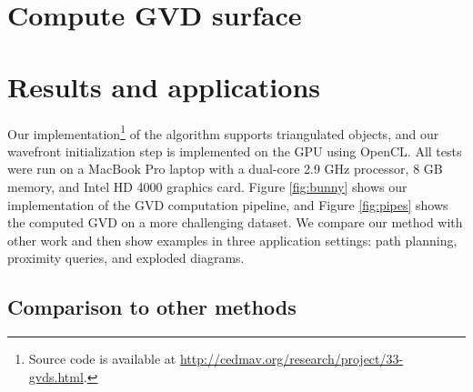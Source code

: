 \documentclass{egpubl}
\begin{document}


\section{Compute GVD surface}
\label{sec:bisector}

\section{Results and applications}
Our implementation\footnote{Source code is available at \url{http://cedmav.org/research/project/33-gvds.html}.} of the algorithm supports  triangulated objects, and our wavefront initialization step is implemented on the GPU using OpenCL. All tests were run on a MacBook Pro laptop with a dual-core 2.9 GHz processor, 8 GB memory, and Intel HD 4000 graphics card. Figure \ref{fig:bunny} shows our implementation of the GVD computation pipeline, and Figure \ref{fig:pipes} shows the computed GVD on a more challenging dataset.  We compare our method with other work and then show examples in three application settings: path planning, proximity queries, and exploded diagrams.

\subsection{Comparison to other methods}


\end{document}
